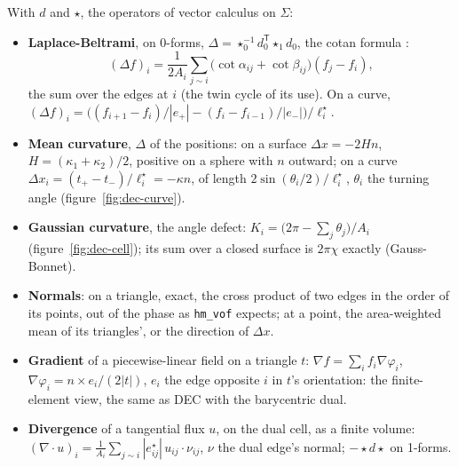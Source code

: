 \documentclass[10pt,a4paper]{article}
\theoremstyle{definition}
\newcommand{\fn}[1]{\texttt{#1}}
\begin{document}
With $d$ and $\star$, the operators of vector calculus on $\Sigma$:
\begin{itemize}
  \item \textbf{Laplace-Beltrami}, on 0-forms, $\Delta = \star_0^{-1}
    d_0^{\mathsf T} \star_1 d_0$, the cotan formula \cite{pinkall}:
    \[
      (\Delta f)_i = \frac{1}{2 A_i} \sum_{j \sim i} \big( \cot\alpha_{ij}
        + \cot\beta_{ij} \big) (f_j - f_i),
    \]
    the sum over the edges at $i$ (the twin cycle of its use). On a curve,
    $(\Delta f)_i = \big( (f_{i+1} - f_i)/|e_+| - (f_i - f_{i-1})/|e_-|
    \big) / \ell^\star_i$.
  \item \textbf{Mean curvature}, $\Delta$ of the positions: on a surface
    $\Delta x = -2 H n$, $H = (\kappa_1 + \kappa_2)/2$, positive on a
    sphere with $n$ outward; on a curve $\Delta x_i = (t_+ - t_-) /
    \ell^\star_i = -\kappa n$, of length $2 \sin(\theta_i/2) /
    \ell^\star_i$, $\theta_i$ the turning angle (figure~\ref{fig:dec-curve}).
  \item \textbf{Gaussian curvature}, the angle defect: $K_i = \big( 2\pi -
    \sum_j \theta_j \big) / A_i$ (figure~\ref{fig:dec-cell}); its sum over
    a closed surface is $2\pi\chi$ exactly (Gauss-Bonnet).
  \item \textbf{Normals}: on a triangle, exact, the cross product of two
    edges in the order of its points, out of the phase as \fn{hm\_vof}
    expects; at a point, the area-weighted mean of its triangles', or the
    direction of $\Delta x$.
  \item \textbf{Gradient} of a piecewise-linear field on a triangle $t$:
    $\nabla f = \sum_i f_i \nabla\varphi_i$, $\nabla \varphi_i = n \times
    e_i / (2 |t|)$, $e_i$ the edge opposite $i$ in $t$'s orientation: the
    finite-element view, the same as DEC with the barycentric dual.
  \item \textbf{Divergence} of a tangential flux $u$, on the dual cell, as
    a finite volume: $(\nabla \cdot u)_i = \frac{1}{A_i} \sum_{j \sim i}
    |e^\star_{ij}|\, u_{ij} \cdot \nu_{ij}$, $\nu$ the dual edge's normal;
    $-\star d \star$ on 1-forms.
\end{itemize}
\end{document}
